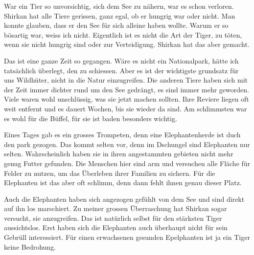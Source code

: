 War ein Tier so unvorsichtig, sich dem See zu nähern, war es schon verloren. Shirkan hat alle Tiere gerissen, ganz egal, ob er hungrig war oder nicht. Man konnte glauben, dass er den See für sich alleine haben wollte. Warum er so bösartig war, weiss ich nicht. Eigentlich ist es nicht die Art der Tiger, zu töten, wenn sie nicht hungrig sind oder zur Verteidigung. Shirkan hat das aber gemacht.

Das ist eine ganze Zeit so gegangen. Wäre es nicht ein Nationalpark, hätte ich tatsächlich überlegt, den zu schiessen. Aber es ist der wichtigste grundsatz für uns Wildhüter, nicht in die Natur einzugreifen. Die anderen Tiere haben sich mit der Zeit immer dichter rund um den See gedrängt, es sind immer mehr geworden. Viele waren wohl unschlüssig, was sie jetzt machen sollten. Ihre Reviere liegen oft weit entfernt und es dauert Wochen, bis sie wieder da sind.  Am schlimmsten war es wohl für die Büffel, für sie ist baden besonders wichtig.

Eines Tages gab es ein grosses Trompeten, denn eine Elephantenherde ist duch den park gezogen. Das kommt selten vor, denn im Dschungel sind Elephanten nur selten. Wahrscheinlich haben sie in ihren angestammten gebieten nicht mehr genug Futter gefunden. Die Menschen hier sind arm und versuchen alle Fläche für Felder zu nutzen, um das Überleben ihrer Familien zu sichern. Für die Elephanten ist das aber oft schlimm, denn dann fehlt ihnen genau dieser Platz.

Auch die Elephanten haben sich angezogen gefühlt von dem See und sind direkt auf ihn los marschiert. Zu meiner grossen Überraschung hat Shirkan sogar versucht, sie anzugreifen. Das ist natürlich selbst für den stärksten Tiger aussichtslos. Erst haben sich die Elephanten auch überhaupt nicht für sein Gebrüll interessiert. Für einen erwachsenen gesunden Epelphanten ist ja ein Tiger keine Bedrohung. 




